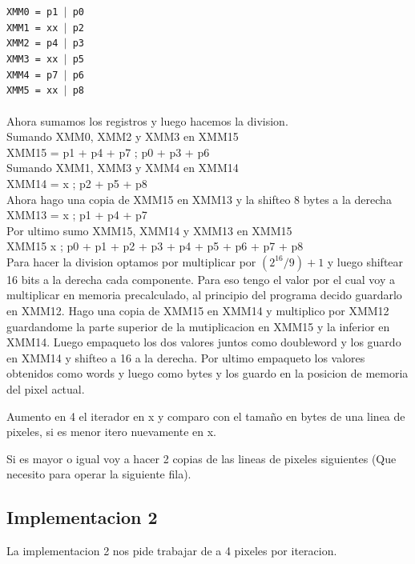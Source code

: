 \noindent
\texttt{XMM0 = p1 $\vert$ p0} \\
\texttt{XMM1 = xx $\vert$ p2} \\
\texttt{XMM2 = p4 $\vert$ p3} \\
\texttt{XMM3 = xx $\vert$ p5} \\ 
\texttt{XMM4 = p7 $\vert$ p6} \\
\texttt{XMM5 = xx $\vert$ p8} \\
\\
Ahora sumamos los registros y luego hacemos la division. \\
Sumando XMM0, XMM2 y XMM3 en XMM15 \\
	XMM15 = p1 + p4 + p7 ; p0 + p3 + p6	\\
Sumando XMM1, XMM3 y XMM4 en XMM14	\\
	XMM14 = x ; p2 + p5 + p8 \\
Ahora hago una copia de XMM15 en XMM13 y la shifteo 8 bytes a la derecha \\
	XMM13 = x ; p1 + p4 + p7 \\
Por ultimo sumo XMM15, XMM14 y XMM13 en XMM15 \\
	XMM15 x ; p0 + p1 + p2 + p3 + p4 + p5 + p6 + p7 + p8 \\

Para hacer la division optamos por multiplicar por $(2^{16} / 9) + 1$ y luego shiftear 16 bits a la derecha cada componente. Para eso tengo el valor por el cual voy a multiplicar en memoria precalculado, al principio del programa decido guardarlo en XMM12.
Hago una copia de XMM15 en XMM14 y multiplico por XMM12 guardandome la parte superior de la mutiplicacion en XMM15 y la inferior en XMM14. Luego empaqueto los dos valores juntos como doubleword y los guardo en XMM14 y shifteo a 16 a la derecha.
Por ultimo empaqueto los valores obtenidos como words y luego como bytes y los guardo en la posicion de memoria del pixel actual.

Aumento en 4 el iterador en x y comparo con el tamaño en bytes de una linea de pixeles, si es menor itero nuevamente en x.

Si es mayor o igual voy a hacer 2 copias de las lineas de pixeles siguientes (Que necesito para operar la siguiente fila).

\subsection{Implementacion 2}
La implementacion 2 nos pide trabajar de a 4 pixeles por iteracion.

